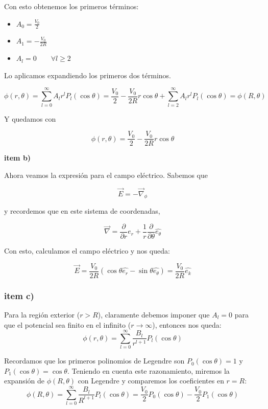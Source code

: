 \documentclass[a4paper]{article}
\begin{document}
Con esto obtenemos los primeros términos:

\begin{itemize}
	\item $A_0 = \frac{V_0}{2}$
	\item $A_1 = - \frac{V_0}{2R}$
	\item $A_l = 0\qquad \forall l \geq 2$
\end{itemize}

 Lo aplicamos expandiendo los primeros dos términos.

$$\phi(r,\theta) = \sum_{l=0}^{\infty} A_l r^l P_l(\cos\theta) = \frac{V_0}{2} - \frac{V_0}{2R} r \cos\theta + \sum_{l=2}^{\infty} A_l r^l P_l(\cos\theta) = \phi(R,\theta)$$


Y quedamos con 

$$\phi(r,\theta) = \frac{V_0}{2} - \frac{V_0}{2R}r\cos\theta$$

\textbf{item b)}

Ahora veamos la expresión para el campo eléctrico. Sabemos que 

$$\vec{E} = -\vec{\nabla}_\phi$$ 

y recordemos que en este sistema de coordenadas, 

$$\vec{\nabla} = \frac{\partial}{\partial r} \hat{e_r} + \frac{1}{r}\frac{\partial}{\partial \theta} \hat{e_\theta}$$

Con esto, calculamos el campo eléctrico y nos queda:

$$\vec{E} = \frac{V_0}{2R}\left(\cos\theta \hat{e_r} - \sin\theta \hat{e_\theta}\right) = \frac{V_0}{2R}\hat{e_k}$$


\subsubsection*{item c)}

Para la región exterior ($r > R$), claramente debemos imponer que $A_{l}=0$ para que el potencial sea finito en el infinito ($r \to \infty$), entonces nos queda:
\begin{equation}
\phi(r,\theta) = \sum_{l=0}^{\infty} \frac{B_l}{r^{l+1}} P_l(\cos\theta)
\end{equation}


Recordamos que los primeros polinomios de Legendre son $P_0(\cos\theta) = 1$ y $P_1(\cos\theta) = \cos\theta$. Teniendo en cuenta este razonamiento, miremos la expansión de $\phi(R,\theta)$ con Legendre y comparemos los coeficientes en $r = R$:
\begin{equation}
\phi(R,\theta) = \sum_{l=0}^{\infty} \frac{B_l}{R^{l+1}} P_l(\cos\theta) = \frac{V_{0}}{2}P_0(\cos\theta) - \frac{V_{0}}{2}P_1(\cos\theta)
\end{equation}
\end{document}
